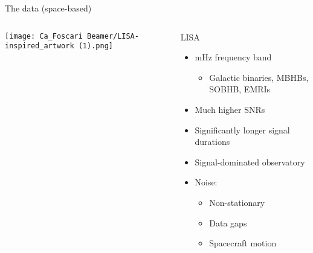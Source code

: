 \documentclass[aspectratio=169, 11pt]{beamer}
\def \bblock{\begin{beamerboxesrounded}[upper=uppercolor,lower=lowercolor,shadow=true]}
\def \eblock{\end{beamerboxesrounded}}
\begin{document}
\begin{frame}{The data (space-based)}
    \begin{columns}
            \centering
            \texttt{[image: Ca\_Foscari Beamer/LISA-inspired\_artwork (1).png]}
         \vspace{1cm}
        \bblock{\centering LISA}
            \begin{itemize}
                \item mHz frequency band
                \begin{itemize}
                    \item Galactic binaries, MBHBs, SOBHB, EMRIs %
                \end{itemize}
            \item Much higher SNRs
            \item Significantly longer signal durations %
            \item Signal-dominated observatory
            \item Noise:
                \begin{itemize}
                    \item Non-stationary
                    \item Data gaps
                    \item Spacecraft motion
                \end{itemize}
            \end{itemize}
        \eblock
        
    \end{columns}
\end{frame}
\end{document}
